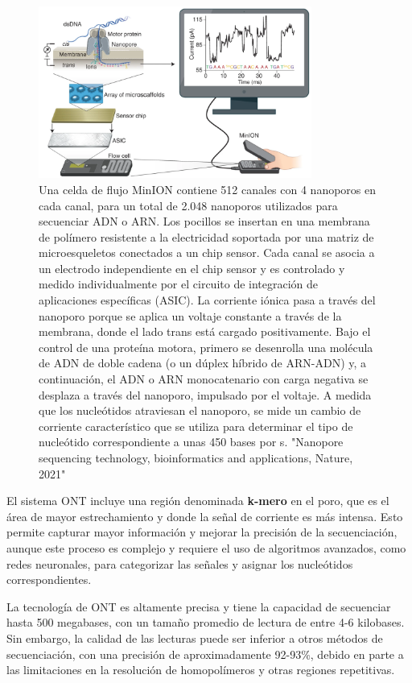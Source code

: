 \begin{itemize}
\begin{figure}[htbp]
\centering
\includegraphics[width = 0.8\textwidth]{figs/nanopore.png}
\caption{Una celda de flujo MinION contiene 512 canales con 4 nanoporos en cada canal, para un total de 2.048 nanoporos utilizados para secuenciar ADN o ARN. Los pocillos se insertan en una membrana de polímero resistente a la electricidad soportada por una matriz de microesqueletos conectados a un chip sensor. Cada canal se asocia a un electrodo independiente en el chip sensor y es controlado y medido individualmente por el circuito de integración de aplicaciones específicas (ASIC). La corriente iónica pasa a través del nanoporo porque se aplica un voltaje constante a través de la membrana, donde el lado trans está cargado positivamente. Bajo el control de una proteína motora, primero se desenrolla una molécula de ADN de doble cadena (o un dúplex híbrido de ARN-ADN) y, a continuación, el ADN o ARN monocatenario con carga negativa se desplaza a través del nanoporo, impulsado por el voltaje. A medida que los nucleótidos atraviesan el nanoporo, se mide un cambio de corriente característico que se utiliza para determinar el tipo de nucleótido correspondiente a unas 450 bases por s. "Nanopore sequencing technology, bioinformatics and applications, Nature, 2021"}
\end{figure}

El sistema ONT incluye una región denominada \textbf{k-mero} en el poro, que es el área de mayor estrechamiento y donde la señal de corriente es más intensa. Esto permite capturar mayor información y mejorar la precisión de la secuenciación, aunque este proceso es complejo y requiere el uso de algoritmos avanzados, como redes neuronales, para categorizar las señales y asignar los nucleótidos correspondientes.

La tecnología de ONT es altamente precisa y tiene la capacidad de secuenciar hasta 500 megabases, con un tamaño promedio de lectura de entre 4-6 kilobases. Sin embargo, la calidad de las lecturas puede ser inferior a otros métodos de secuenciación, con una precisión de aproximadamente 92-93\%, debido en parte a las limitaciones en la resolución de homopolímeros y otras regiones repetitivas.


\end{itemize}
